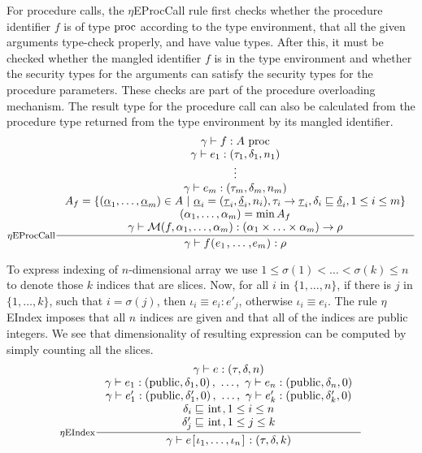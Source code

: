 \documentclass[a4paper, 10pt, draft]{report}
\newcommand{\mycode}[1]{\ensuremath{\mbox{\lstinline{#1}}}}
\begin{document}
For procedure calls, the $\eta$EProcCall rule first checks whether the
procedure identifier $f$ is of type \mycode{proc} according to the type
environment, that all the given arguments type-check properly, and have value
types. After this, it must be checked whether the mangled identifier $f$ is in
the type environment and whether the security types for the arguments can
satisfy the security types for the procedure parameters. These checks are part
of the procedure overloading mechanism. The result type for the procedure call
can also be calculated from the procedure type returned from the type
environment by its mangled identifier.
\[ \inference[$\eta$EProcCall]{
  \gamma |- f : A\ \mycode{proc}\\
  \gamma |- e_1 : (\tau_1, \delta_1, n_1) \\
  \vdots \\
  \gamma |- e_m : (\tau_m, \delta_m, n_m) \\
  A_f = \left\{ (\underline{\alpha}_1, \dots, \underline{\alpha}_m) \in A\ |\ \underline{\alpha}_i = (\underline{\tau}_i, \underline{\delta}_i, n_i), \tau_i \to \underline{\tau}_i, \delta_i \sqsubseteq \underline{\delta}_i, 1 \le i \le m \right\}\\
  (\alpha_1, \dots, \alpha_m) = \min A_f \\
  \gamma |- \mathcal{M}(f, \alpha_1, \ldots, \alpha_m)
  : \left( \alpha_1 \times \ldots \times \alpha_m \right)  \to \rho \\
}{\gamma |- f\mycode{(}e_1\mycode{,}\ldots\mycode{,}e_m\mycode{)} : \rho}
\]

To express indexing of $n$-dimensional array we use $1 \leq \sigma(1) < \ldots
< \sigma(k) \leq n$ to denote those $k$ indices that are slices. Now, for all
$i$ in $\{1, \ldots, n\}$, if there is $j$ in $\{1,\ldots,k\}$, such that $i =
\sigma(j)$, then $\iota_i \equiv e_i : e'_j$, otherwise $\iota_i \equiv e_i$.
The rule $\eta$EIndex imposes that all $n$ indices are given and that all of
the indices are public integers. We see that dimensionality of resulting
expression can be computed by simply counting all the slices.
\[
\inference[$\eta$EIndex]
{
  \gamma |- e : \left( \tau, \delta, n \right) \\
  \gamma |- e_1 : \left(\mycode{public}, \delta_1, 0 \right),\ \ldots,\ \gamma |- e_n : \left(\mycode{public}, \delta_n, 0 \right)\\
  \gamma |- e'_1 : \left(\mycode{public}, \delta'_1, 0 \right),\ \ldots,\ \gamma |- e'_k : \left(\mycode{public}, \delta'_k, 0 \right) \\
  \delta_i \sqsubseteq \mycode{int}, 1 \le i \le n \\
  \delta'_j \sqsubseteq \mycode{int}, 1 \le j \le k
}
{
  \gamma |- e \mycode{[} \iota_1, \ldots, \iota_n \mycode{]} : \left(\tau, \delta, k\right)
}
\]
\end{document}

